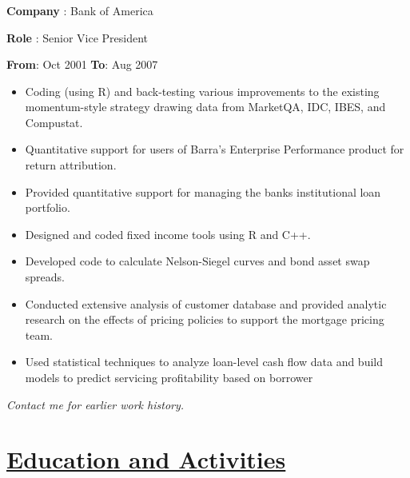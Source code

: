 \documentclass[
]{article}
\providecommand{\tightlist}{%
  \setlength{\itemsep}{0pt}\setlength{\parskip}{0pt}}
\begin{document}

\hypertarget{bofa}{\subsubsection{}\label{bofa}}
\begin{flushleft}
\textbf{Company} : Bank of America
\end{flushleft}

\begin{flushleft}
\textbf{Role} : Senior Vice President
\end{flushleft}
\textbf{From}: Oct 2001 \hspace{0.5in}  \textbf{To}: Aug 2007\\

  \begin{itemize}
  \tightlist
  \item
    Coding (using R) and back-testing various improvements to the
    existing momentum-style strategy drawing data from MarketQA, IDC,
    IBES, and Compustat.
  \item
    Quantitative support for users of Barra's Enterprise Performance
    product for return attribution.

  \item  Provided quantitative support for managing the banks institutional loan portfolio.
  \item
    Designed and coded fixed income tools using R and C++.
  \item
    Developed code to calculate Nelson-Siegel curves and bond asset swap
    spreads.

  \item   Conducted extensive analysis of customer database and provided
  analytic research on the effects of pricing policies to support the
  mortgage pricing team. 
  \item Used statistical techniques to analyze
  loan-level cash flow data and build models to predict servicing
  profitability based on borrower
  \end{itemize}

\emph{Contact me for earlier work history.}

\hypertarget{education-and-activities}{
\section{\texorpdfstring{\underline{\textbf{Education and
Activities}}}{Education and Activities}}\label{education-and-activities}}
\end{document}
